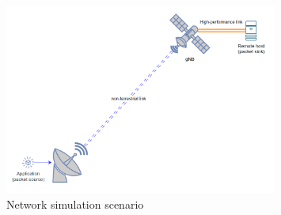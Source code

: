 \begin{figure}[ht]
    \centering
    \includegraphics[width=0.8\textwidth]{res/sim-scenario.png}
    \caption{Network simulation scenario}
    \label{fig:sim-scenario}
\end{figure}

